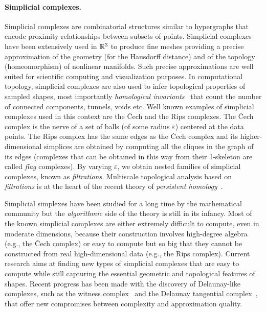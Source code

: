 \paragraph{Simplicial complexes.}  
Simplicial complexes are combinatorial structures similar to hypergraphs that encode proximity relationships between subsets of points.
Simplicial complexes have been extensively used in $\mathbb R ^3$ to produce fine meshes  providing a precise approximation of the geometry  (for the Hausdorff distance) and of the topology  (homeomorphism) of nonlinear manifolds.  Such precise approximations are
 well suited for scientific computing and visualization purposes.  In computational topology, simplicial complexes are also used to infer topological properties of sampled shapes, most importantly {\em homological invariants}~\cite{kmm-ch-2003} that count the number of connected components, tunnels, voids etc.  Well known examples of simplicial complexes used in this context are the \v{C}ech and the Rips complexes. The \v{C}ech 
complex is the nerve of a set of balls (of some radius $\varepsilon$) centered at the data points. 
The Rips complex  has the same edges as the \v{C}ech complex and its higher-dimensional simplices are obtained by computing all the cliques in the graph of its edges (complexes that can be obtained in this way from their 1-skeleton are called {\em flag} complexes). By varying $\varepsilon$, we obtain nested families of simplicial complexes, known as {\em filtrations.}
Multiscale topological analysis based on {\em filtrations} is at the heart of the recent theory of {\em persistent homology}~\cite{hh-ct-2010,az-tfc-2009}.
 
Simplicial simplexes have been studied for a long time by the mathematical community but the {\em algorithmic} side of the theory is still in its infancy. Most of the known simplicial complexes are either extremely difficult to compute, even in moderate dimensions, because their construction involves high-degree algebra (e.g., the  \v{C}ech complex) or easy to compute but so big that they cannot be constructed from real high-dimensional data (e.g., the Rips complex). Current research aims at finding new types of simplicial complexes that are easy to compute while still capturing the essential geometric and topological features of shapes. Recent progress has been made with the discovery of Delaunay-like complexes, such as the witness complex~\cite{cds-tewc-2004} and the Delaunay tangential complex~\cite{geometrica-7142i}, that offer new compromises between complexity and approximation quality.

